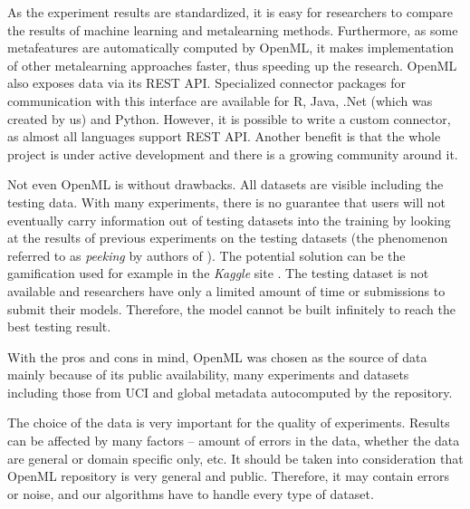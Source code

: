 As the experiment results are standardized, it is easy for researchers to compare the results of machine learning and metalearning methods. Furthermore, as some metafeatures are automatically computed by OpenML, it makes implementation of other metalearning approaches faster, thus speeding up the research. OpenML also exposes data via its REST API. Specialized connector packages for communication with this interface are available for R, Java, .Net (which was created by us) and Python. However, it is possible to write a custom connector, as almost all languages support REST API. Another benefit is that the whole project is under active development and there is a growing community around it. 

Not even  OpenML is without drawbacks. All datasets are visible including the testing data. With many experiments, there is no guarantee that users will not eventually carry information out of testing datasets into the training by looking at the results of previous experiments on the testing datasets (the phenomenon referred to as \emph{peeking} by authors of \cite{aima3ed}). The potential solution can be the gamification used for example in the \emph{Kaggle} site \cite{kaggle}. The testing dataset is not available and researchers have only a limited amount of time or submissions to submit their models. Therefore, the model cannot be built infinitely to reach the best testing result.

With the pros and cons in mind, OpenML was chosen as the source of data mainly because of its public availability, many experiments and datasets including those from UCI and global metadata autocomputed by the repository.
 
 The choice of the data is very important for the quality of experiments. Results can be affected by many factors -- amount of errors in the data, whether the data are general or domain specific only, etc. It should be taken into consideration that OpenML repository is very general and public. Therefore, it may contain errors or noise, and our algorithms have to handle every type of dataset.

